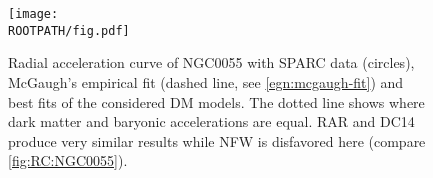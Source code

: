 \begin{figure}%
	\centering%
	\texttt{[image: \\ROOTPATH/fig.pdf]}
	\caption{Radial acceleration curve of NGC0055 with SPARC data (circles), McGaugh's empirical fit (dashed line, see \cref{egn:mcgaugh-fit}) and best fits of the considered DM models. The dotted line shows where dark matter and baryonic accelerations are equal. RAR and DC14 produce very similar results while NFW is disfavored here (compare \cref{fig:RC:NGC0055}).}%
\label{fig:AC:NGC0055}
\end{figure}